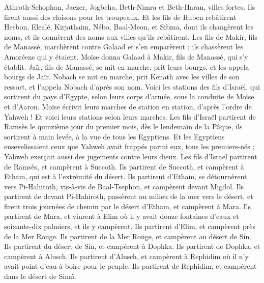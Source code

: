 \begin{multicols}{2}
Athroth-Schophan, Jaezer, Jogbeha,
Beth-Nimra et Beth-Haran, villes fortes. Ils firent aussi des cloisons pour les troupeaux.
Et les fils de Ruben rebâtirent Hesbon, Elealé, Kirjathaim,
Nébo, Baal-Meon, et Sibma, dont ils changèrent les noms, et ils donnèrent des noms aux villes qu'ils rebâtirent.
Les fils de Makir, fils de Manassé, marchèrent contre Galaad et s'en emparèrent ; ils chassèrent les Amoréens qui y étaient.
Moïse donna Galaad à Makir, fils de Manassé, qui s'y établit.
Jaïr, fils de Manassé, se mit en marche, prit leurs bourgs, et les appela bourgs de Jaïr.
Nobach se mit en marche, prit Kenath avec les villes de son ressort, et l'appela Nobach d'après son nom.
\VerseOne{}Voici les stations des fils d'Israël, qui sortirent du pays d'Egypte, selon leurs corps d'armée, sous la conduite de Moïse et d'Aaron.
Moïse écrivit leurs marches de station en station, d'après l'ordre de Yahweh ! Et voici leurs stations selon leurs marches.
Les fils d'Israël partirent de Ramsès le quinzième jour du premier mois, dès le lendemain de la Pâque, ils sortirent à main levée, à la vue de tous les Egyptiens.
Et les Egyptiens ensevelissaient ceux que Yahweh avait frappés parmi eux, tous les premiers-nés ; Yahweh exerçait aussi des jugements contre leurs dieux.
Les fils d'Israël partirent de Ramsès, et campèrent à Succoth.
Ils partirent de Succoth, et campèrent à Etham, qui est à l'extrémité du désert.
Ils partirent d'Etham, se détournèrent vers Pi-Hahiroth, vis-à-vis de Baal-Tsephon, et campèrent devant Migdol.
Ils partirent de devant Pi-Hahiroth, passèrent au milieu de la mer vers le désert, et firent trois journées de chemin par le désert d'Etham, et campèrent à Mara.
Ils partirent de Mara, et vinrent à Elim où il y avait douze fontaines d'eaux et soixante-dix palmiers, et ils y campèrent.
Ils partirent d'Elim, et campèrent près de la Mer Rouge.
Ils partirent de la Mer Rouge, et campèrent au désert de Sin.
Ils partirent du désert de Sin, et campèrent à Dophka.
Ils partirent de Dophka, et campèrent à Alusch.
Ils partirent d'Alusch, et campèrent à Rephidim où il n'y avait point d'eau à boire pour le peuple.
Ils partirent de Rephidim, et campèrent dans le désert de Sinaï.

\end{multicols}

